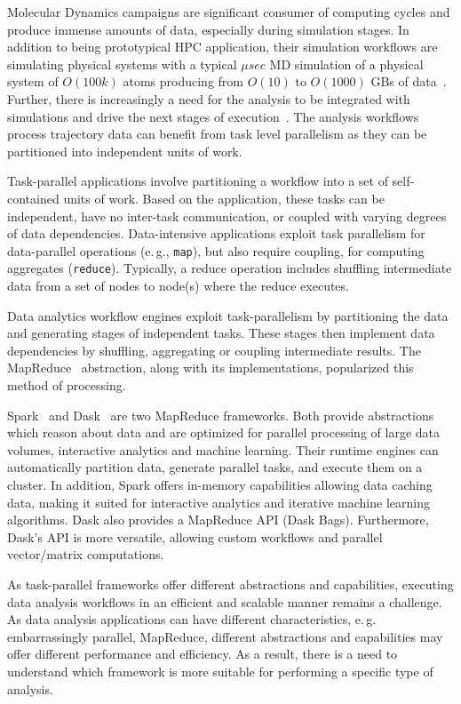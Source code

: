 \label{ch:task-par}

Molecular Dynamics campaigns are significant consumer of computing cycles and produce immense amounts of data, especially during simulation stages.
In addition to being prototypical HPC application, their simulation workflows are simulating physical systems with a typical $\mu sec$ MD simulation of a physical system of $O(100k)$ atoms producing from $O(10)$ to $O(1000)$ GBs of data~\cite{cheatham2015impact}.
Further, there is increasingly a need for the analysis to be integrated with simulations and drive the next stages of execution~\cite{balasubramanian2016extasy}.
The analysis workflows process trajectory data can benefit from task level parallelism as they can be partitioned into independent units of work.

Task-parallel applications involve partitioning a workflow into a set of self-contained units of work.
Based on the application, these tasks can be independent, have no inter-task communication, or coupled with varying degrees of data dependencies.
Data-intensive applications exploit task parallelism for data-parallel operations (e.\,g., \texttt{map}), but also require coupling, for computing aggregates (\texttt{reduce}).
Typically, a reduce operation includes shuffling intermediate data from a set of nodes to node(s) where the reduce executes.

Data analytics workflow engines exploit task-parallelism by partitioning the data and generating stages of independent tasks.
These stages then implement data dependencies by shuffling, aggregating or coupling intermediate results.
The MapReduce~\cite{dean2004mapreduce} abstraction, along with its implementations, popularized this method of processing.

Spark~\cite{zaharia2010spark} and Dask~\cite{rocklin2015dask} are two MapReduce  frameworks.
Both provide abstractions which reason about data and are optimized for parallel processing of large data volumes, interactive analytics and machine learning.
Their runtime engines can automatically partition data, generate parallel tasks, and execute them on a cluster.
In addition, Spark offers in-memory capabilities allowing data caching data, making it suited for interactive analytics and iterative machine learning algorithms.
Dask also provides a MapReduce API (Dask Bags).
Furthermore, Dask's API is more versatile, allowing custom workflows and parallel vector/matrix computations.

As task-parallel frameworks offer different abstractions and capabilities, executing data analysis workflows in an efficient and scalable manner remains a challenge.
As data analysis applications can have different characteristics, e.\,g.\, embarrassingly parallel, MapReduce, different abstractions and capabilities may offer different performance and efficiency.
As a result, there is a need to understand which framework is more suitable for performing a specific type of analysis.

